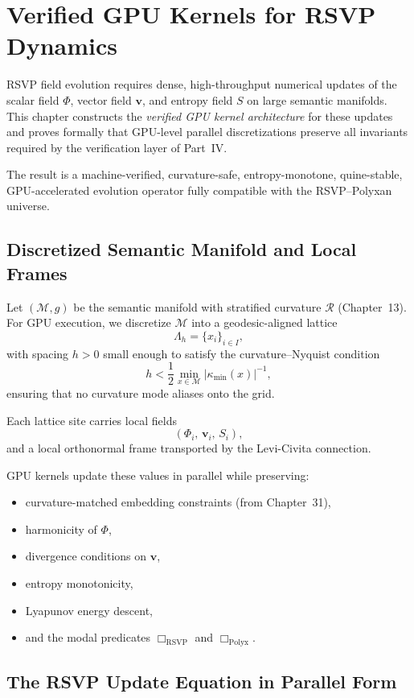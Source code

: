 \chapter{Verified GPU Kernels for RSVP Dynamics}
\label{ch:44}

RSVP field evolution requires dense, high-throughput numerical updates of the scalar field $\Phi$, vector field $\mathbf{v}$, and entropy field $S$ on large semantic manifolds.  
This chapter constructs the \emph{verified GPU kernel architecture} for these updates and proves formally that GPU-level parallel discretizations preserve all invariants required by the verification layer of Part~IV.

The result is a machine-verified, curvature-safe, entropy-monotone, quine-stable, GPU-accelerated evolution operator fully compatible with the RSVP--Polyxan universe.

\section{Discretized Semantic Manifold and Local Frames}

Let $(\mathcal{M},g)$ be the semantic manifold with stratified curvature $\mathcal{R}$ (Chapter~13).  
For GPU execution, we discretize $\mathcal{M}$ into a geodesic-aligned lattice
\[
\Lambda_h = \{x_i\}_{i\in I},
\]
with spacing $h>0$ small enough to satisfy the curvature--Nyquist condition
\[
h < \frac{1}{2}\min_{x\in\mathcal{M}}\left|\kappa_{\min}(x)\right|^{-1},
\]
ensuring that no curvature mode aliases onto the grid.

Each lattice site carries local fields
\[
(\Phi_i,\, \mathbf{v}_i,\, S_i),
\]
and a local orthonormal frame transported by the Levi-Civita connection.

GPU kernels update these values in parallel while preserving:
\begin{itemize}
\item curvature-matched embedding constraints (from Chapter~31),
\item harmonicity of $\Phi$,
\item divergence conditions on $\mathbf{v}$,
\item entropy monotonicity,
\item Lyapunov energy descent,
\item and the modal predicates $\Box_{\mathrm{RSVP}}$ and $\Box_{\mathrm{Polyx}}$.
\end{itemize}

\section{The RSVP Update Equation in Parallel Form}

